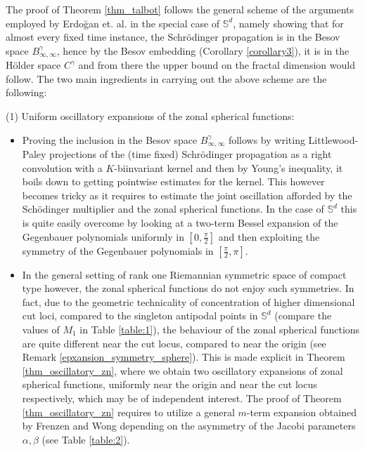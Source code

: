 \documentclass[12pt]{amsart}
\theoremstyle{definition}
\newcommand{\Sb}{\mathbb S}%
\numberwithin{equation}{section}
\begin{document}
The proof of Theorem \ref{thm_talbot} follows the general scheme of the arguments employed by Erdo\u{g}an et. al. \cite{MathZ} in the special case of $\Sb^d$, namely showing that for almost every fixed time instance, the Schr\"odinger propagation is in the Besov space $B^{\gamma}_{\infty,\infty}$, hence by the Besov embedding (Corollary \ref{corollary3}), it is in the H\"older space $C^\gamma$ and from there the upper bound on the fractal dimension would follow. The two main ingredients in carrying out the above scheme are the following:

\medskip

(1) Uniform oscillatory expansions of the zonal spherical functions:

\begin{itemize}
\item Proving the inclusion in the Besov space $B^{\gamma}_{\infty,\infty}$ follows by writing Littlewood-Paley projections of the (time fixed) Schr\"odinger propagation as a right convolution with a $K$-biinvariant kernel and then by Young's inequality, it boils down to getting pointwise estimates for the kernel. This however becomes tricky as it requires to estimate the joint oscillation afforded by the Sch\"odinger multiplier and the zonal spherical functions. In the case of $\Sb^d$ this is quite easily overcome by looking at a two-term Bessel expansion of the Gegenbauer polynomials uniformly in $\left[0,\frac{\pi}{2}\right]$ \cite[Theorem 1.2]{Baratella} and then exploiting the symmetry of the Gegenbauer polynomials in $\left[\frac{\pi}{2},\pi\right]$.

\medskip

\item In the general setting of rank one Riemannian symmetric space of compact type however, the zonal spherical functions do not enjoy such symmetries. In fact, due to the geometric technicality of concentration of higher dimensional cut loci, compared to the singleton antipodal points in $\Sb^d$ (compare the values of $M_1$ in Table \ref{table:1}), the behaviour of the zonal spherical functions are quite different near the cut locus, compared to near the origin (see Remark \ref{epxansion_symmetry_sphere}). This is made explicit in Theorem \ref{thm_oscillatory_zn}, where we obtain two oscillatory expansions of zonal spherical functions, uniformly near the origin and near the cut locus respectively, which may be of independent interest. The proof of Theorem \ref{thm_oscillatory_zn} requires to utilize a general $m$-term expansion obtained by Frenzen and Wong \cite{Frenzen} depending on the asymmetry of the Jacobi parameters $\alpha,\beta$ (see Table \ref{table:2}).   
\end{itemize}
\end{document}
